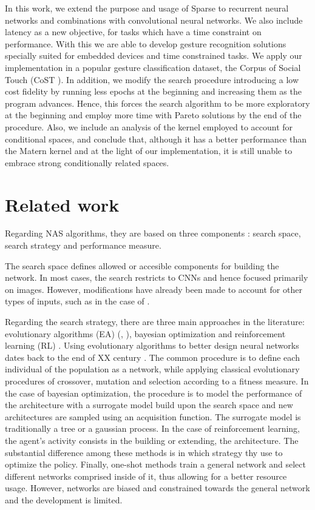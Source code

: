 \documentclass[a4paper, twocolumn]{article}
\begin{document}
In this work, we extend the purpose and usage of Sparse to recurrent neural networks and combinations with convolutional neural networks. We also include latency as a new objective, for tasks which have a time constraint on performance. With this we are able to develop gesture recognition solutions specially suited for embedded devices and time constrained tasks. We apply our implementation in a popular gesture classification dataset, the Corpus of Social Touch (CoST \cite{Jung2014}). In addition, we modify the search procedure introducing a low cost fidelity by running less epochs at the beginning and increasing them as the program advances. Hence, this forces the search algorithm to be more exploratory at the beginning and employ more time with Pareto solutions by the end of the procedure. Also, we include an analysis of the kernel employed to account for conditional spaces, and conclude that, although it has a better performance than the Matern kernel and at the light of our implementation, it is still unable to embrace strong conditionally related spaces.

\section{Related work}

Regarding NAS algorithms, they are based on three components \cite{Elsken2019a}: search space, search strategy and performance  measure. 

The search space defines allowed or accesible components for building the network. In most cases, the search restricts to CNNs and hence focused primarily on images. However, modifications have already been made to account for other types of inputs, such as in the case of \cite{Wang2019a}.

Regarding the search strategy, there are three main approaches in the literature: evolutionary algorithms (EA) (\cite{Xie2017}, \cite{Stanley2002}), bayesian optimization \cite{Zhou2019a} and reinforcement learning (RL) \cite{Baker2016}. Using evolutionary algorithms to better design neural networks dates back to the end of XX century \cite{Branke2017}. The common procedure is to define each individual of the population as a network, while applying classical evolutionary procedures of crossover, mutation and selection according to a fitness measure. In the case of bayesian optimization, the procedure is to model the performance of the architecture with a surrogate model build upon the search space and new architectures are sampled using an acquisition function. The surrogate model is traditionally a tree or a gaussian process. In the case of reinforcement learning, the agent's activity consists in the building or extending, the architecture. The substantial difference among these methods is in which strategy thy use to optimize the policy. Finally, one-shot methods train a general network and select different networks comprised inside of it, thus allowing for a better resource usage. However, networks are biased and constrained towards the general network and the development is limited.
\end{document}
